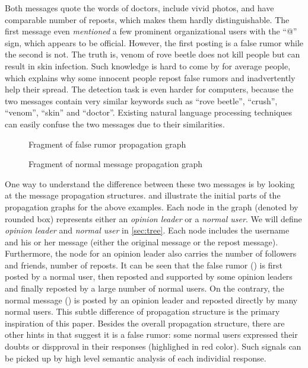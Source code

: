 Both messages quote the words of doctors, include vivid photos,
and have comparable number of reposts, which makes them
hardly distinguishable. The first message even {\em mentioned}
a few prominent organizational
users with the ``@'' sign, which appears to be official.
However, the first posting is a false rumor while the second is not.
The truth is, venom of rove beetle does not kill people but can result in
skin infection. Such knowledge is hard to come by for average
people, which explains why some innocent people repost false rumors and
inadvertently help their spread. The detection task is even
harder for computers, because the two messages contain very similar
keywords such as ``rove beetle'', ``crush'', ``venom'', ``skin''
and ``doctor''. Existing natural language processing techniques can easily
confuse the two messages due to their similarities.

\begin{figure*}[th]
\centering
{}
\caption{Fragment of false rumor propagation graph}
\label{fig:example1_details}
\vspace*{2mm}
\caption{Fragment of normal message propagation graph}
\label{fig:example2_details}
\end{figure*}

One way to understand the difference between these two messages
is by looking at the message propagation structures.
 and
 illustrate the initial parts of the
propagation graphs for the above examples.
Each node in the graph (denoted by rounded box) represents either
an {\em opinion leader} or
a {\em normal user}. We will define {\em opinion leader}
and {\em normal user} in \ref{sec:tree}. Each node
includes the username and his or her message (either the original message
or the repost message). Furthermore,
the node for an opinion leader also carries the number of followers
and friends, number of reposts. It can be seen that the
false rumor () is first posted by
a normal user, then reposted and supported by some opinion leaders
and finally reposted by a large number of normal users.
On the contrary, the normal message ()
is posted by an opinion leader and reposted directly by many normal users.
This subtle difference of propagation structure is the primary
inspiration of this paper. Besides the overall propagation structure, there
are other hints in  that suggest it is a false
rumor: some normal users expressed their doubts or dispproval in their
responses (highlighed in red color). Such signals can be picked up
by high level semantic analysis of each individial response.

